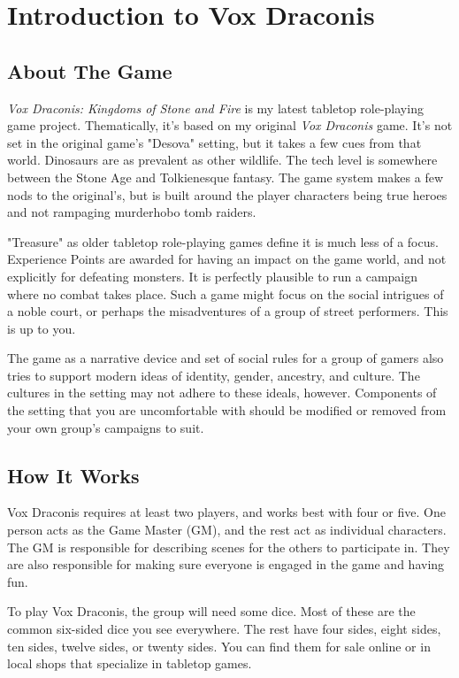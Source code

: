 \chapter{Introduction to Vox Draconis}

\begin{multicols}{2}

\section{About The Game}

\textit{Vox Draconis: Kingdoms of Stone and Fire} is my latest tabletop
role-playing game project. Thematically, it's based on my original \textit{Vox
Draconis} game. It's not set in the original game's
"Desova" setting, but it takes a few cues from that world. Dinosaurs
are as prevalent as other wildlife. The tech level is somewhere between
the Stone Age and Tolkienesque fantasy. The game system makes a few nods
to the original's, but is built around the player characters being true
heroes and not rampaging murderhobo tomb raiders.

"Treasure" as older tabletop role-playing games define it is much less
of a focus. Experience Points are awarded for having an impact on the
game world, and not explicitly for defeating monsters. It is perfectly
plausible to run a campaign where no combat takes place. Such a game
might focus on the social intrigues of a noble court, or perhaps the
misadventures of a group of street performers. This is up to you.

The game as a narrative device and set of social rules for a group of gamers 
also tries to support modern ideas of identity, gender, ancestry, and culture. 
The cultures in the setting may not adhere to these ideals, however. Components
of the setting that you are uncomfortable with should be modified or removed
from your own group's campaigns to suit.

\section{How It Works}

Vox Draconis requires at least two players, and works best with four or five. 
One person acts as the Game Master (GM), and the rest act as individual characters. The
GM is responsible for describing scenes for the others to participate in.
They are also responsible for making sure everyone is engaged in the game and
having fun.

To play Vox Draconis, the group will need some dice. Most of these are the common
six-sided dice you see everywhere. The rest have four sides, eight sides, ten sides,
twelve sides, or twenty sides. You can find them for sale online or in
local shops that specialize in tabletop games.


\end{multicols}
